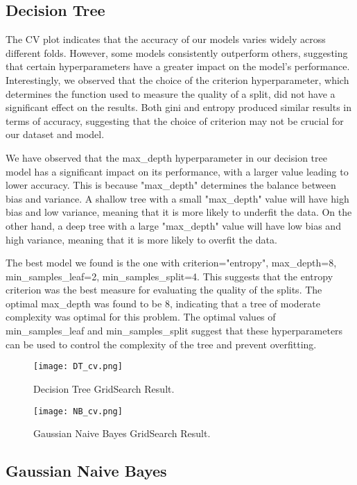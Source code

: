 \documentclass{article}
\begin{document}
\subsection{Decision Tree}

The CV plot indicates that the accuracy of our models varies widely across different folds. However, some models consistently outperform others, suggesting that certain hyperparameters have a greater impact on the model's performance. Interestingly, we observed that the choice of the criterion hyperparameter, which determines the function used to measure the quality of a split, did not have a significant effect on the results. Both gini and entropy produced similar results in terms of accuracy, suggesting that the choice of criterion may not be crucial for our dataset and model. 

We have observed that the max\_depth hyperparameter in our decision tree model has a significant impact on its performance, with a larger value leading to lower accuracy. This is because "max\_depth" determines the balance between bias and variance. A shallow tree with a small "max\_depth" value will have high bias and low variance, meaning that it is more likely to underfit the data. On the other hand, a deep tree with a large "max\_depth" value will have low bias and high variance, meaning that it is more likely to overfit the data.

The best model we found is the one with criterion="entropy", max\_depth=8, min\_samples\_leaf=2, min\_samples\_split=4. This suggests that the entropy criterion was the best measure for evaluating the quality of the splits. The optimal max\_depth was found to be 8, indicating that a tree of moderate complexity was optimal for this problem. The optimal values of min\_samples\_leaf and min\_samples\_split suggest that these hyperparameters can be used to control the complexity of the tree and prevent overfitting.

\begin{figure}[h]
  \centering
  \texttt{[image: DT\_cv.png]}
  \caption{Decision Tree GridSearch Result.}
\end{figure}

\begin{figure}[h]
  \centering
  \texttt{[image: NB\_cv.png]}
  \caption{Gaussian Naive Bayes GridSearch Result.}
\end{figure}

\subsection{Gaussian Naive Bayes}
\end{document}
